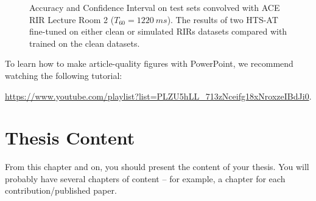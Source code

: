 \documentclass[a4paper,12pt,twoside,openany]{book}
\newif\ifthesis
\begin{document}
    \begin{figure}[h]
        \centering
        \centering
        \caption{Accuracy and Confidence Interval on test sets convolved with ACE RIR Lecture Room 2 ($T_{60}=1220~ms$). The results of two HTS-AT fine-tuned on either clean or simulated RIRs datasets compared with trained on the clean datasets.}
        \label{fig:HTS-AT_VS_BLSTM}
    \end{figure}
    
    To learn how to make article-quality figures with PowerPoint, we recommend watching the following tutorial: 
    
    \url{https://www.youtube.com/playlist?list=PLZU5hLL_713zNceifg18xNroxzeIBdJi0}.
     
\color{black}


\ifthesis
\chapter{Thesis Content}
\color{teal}
        From this chapter and on, you should present the content of your thesis. You will probably have several chapters of content -- for example, a chapter for each contribution/published paper.
\end{document}
